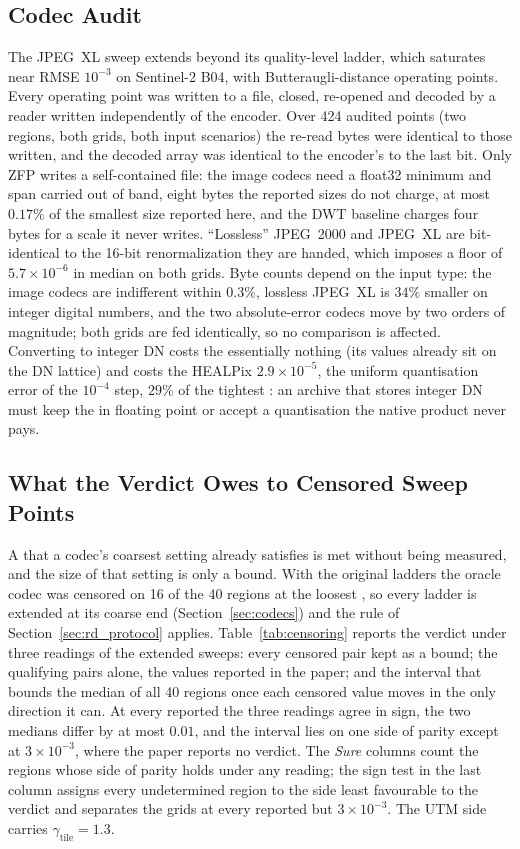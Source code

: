 \subsection{Codec Audit}
\label{app:codec_audit}
The JPEG~XL sweep extends beyond its quality-level ladder, which
saturates near RMSE $10^{-3}$ on Sentinel-2 B04, with Butteraugli-distance
operating points. Every operating point was written to a file, closed,
re-opened and decoded by a reader written independently of the encoder.
Over 424 audited points (two regions, both grids, both input scenarios)
the re-read bytes were identical to those written, and the decoded array
was identical to the encoder's to the last bit. Only ZFP writes a
self-contained file: the image codecs need a float32 minimum and span
carried out of band, eight bytes the reported sizes do not charge, at
most $0.17\%$ of the smallest size reported here, and the DWT baseline
charges four bytes for a scale it never writes. ``Lossless'' JPEG~2000
and JPEG~XL are bit-identical to the 16-bit renormalization they are
handed, which imposes a floor of $5.7\times10^{-6}$ in median on both
grids. Byte counts depend on the input type: the image codecs are
indifferent within $0.3\%$, lossless JPEG~XL is $34\%$ smaller on
integer digital numbers, and the two absolute-error codecs move by two
orders of magnitude; both grids are fed identically, so no comparison is
affected. Converting to integer DN costs the 
essentially nothing (its values already sit on the DN lattice) and costs
the HEALPix  $2.9\times10^{-5}$, the uniform quantisation
error of the $10^{-4}$ step, $29\%$ of the tightest : an
archive that stores integer DN must keep the  in floating
point or accept a quantisation the native product never pays.

\subsection{What the Verdict Owes to Censored Sweep Points}
\label{app:censoring}
A  that a codec's coarsest setting already satisfies is met
without being measured, and the size of that setting is only a bound.
With the original ladders the oracle codec was censored on 16 of the 40
regions at the loosest , so every ladder is extended at
its coarse end (Section~\ref{sec:codecs}) and the rule of
Section~\ref{sec:rd_protocol} applies. Table~\ref{tab:censoring} reports
the verdict under three readings of the extended sweeps: every censored
pair kept as a bound; the qualifying pairs alone, the values reported in
the paper; and the interval that bounds the median of all 40 regions once
each censored value moves in the only direction it can. At every
reported  the three readings agree in sign, the two medians
differ by at most $0.01$, and the interval lies on one side of parity
except at $3\times10^{-3}$, where the paper reports no verdict. The
\emph{Sure} columns count the regions whose side of parity holds under any
reading; the sign test in the last column assigns every undetermined
region to the side least favourable to the verdict and separates the
grids at every reported  but $3\times10^{-3}$. The UTM side
carries $\gamma_{\mathrm{tile}}=1.3$.

